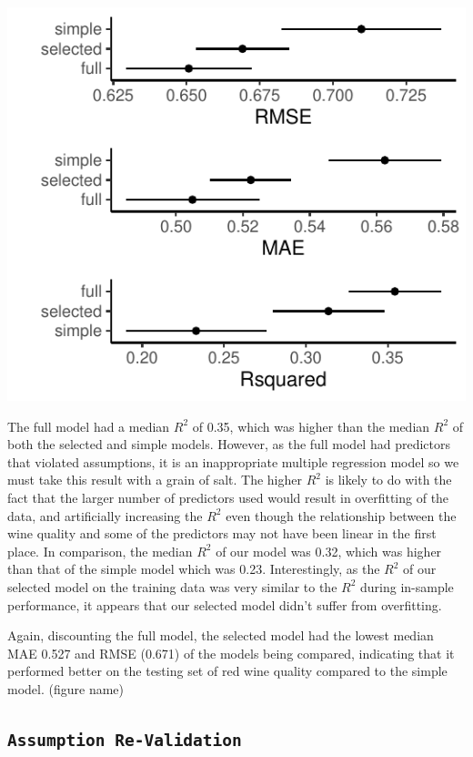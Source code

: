 \documentclass[letterpaper,8pt,twocolumn,twoside,]{pinp}
\begin{document}
\begin{center}\includegraphics{pinp_files/figure-latex/unnamed-chunk-2-1} \end{center}

The full model had a median \(R^2\) of 0.35, which was higher than the
median \(R^2\) of both the selected and simple models. However, as the
full model had predictors that violated assumptions, it is an
inappropriate multiple regression model so we must take this result with
a grain of salt. The higher \(R^2\) is likely to do with the fact that
the larger number of predictors used would result in overfitting of the
data, and artificially increasing the \(R^2\) even though the
relationship between the wine quality and some of the predictors may not
have been linear in the first place. In comparison, the median \(R^2\)
of our model was 0.32, which was higher than that of the simple model
which was 0.23. Interestingly, as the \(R^2\) of our selected model on
the training data was very similar to the \(R^2\) during in-sample
performance, it appears that our selected model didn't suffer from
overfitting.

Again, discounting the full model, the selected model had the lowest
median MAE 0.527 and RMSE (0.671) of the models being compared,
indicating that it performed better on the testing set of red wine
quality compared to the simple model. (figure name)

\hypertarget{assumption-re-validation}{%
\subsection{\texorpdfstring{\texttt{Assumption\ Re-Validation}}{Assumption Re-Validation}}\label{assumption-re-validation}}
\end{document}
